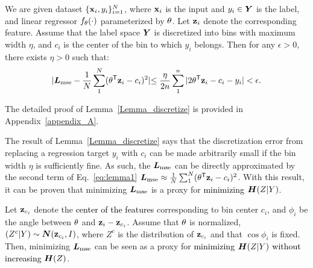 \documentclass{article} %
\def\shihao{\textcolor{black}}
\begin{document}
\begin{lemma}
\label{Lemma_discretize}
	We are given dataset $\{{\bf x}_i, y_i\}^N_{i=1}$, where ${\bf x}_i$ is the input and $y_i \in {\bm{Y}}$ is the label,
	and linear regressor $f_{\theta}(\cdot)$ parameterized by 
	${\theta}$.  
	Let ${\bf z}_i$ denote the corresponding feature. 
	Assume that the label space ${\bm{Y}}$ is discretized into bins with maximum width $\eta$, and $c_i$ is the center of the bin to which $y_i$ belongs. Then for any $\epsilon >0$, there exists $\eta>0$ such that:
\begin{equation}\label{eq:lemma1}
	 |\mL_{{\text{mse}}} - \frac{1}{N} \sum_{1}^{N}(\varreg^{\trsp}\bz_i -c_i)^2| \shihao{\leq  
    \frac{\eta}{2n} \sum_{1}^{n}|2\varreg^{\trsp}\bz_i -c_i -y_i|} < \epsilon.
    \end{equation}
\end{lemma}

The detailed proof of Lemma~\ref{Lemma_discretize} is provided in Appendix~\ref{appendix_A}. 

The result of Lemma~\ref{Lemma_discretize} says that the discretization error from replacing a regression target $y_i$ with $c_i$ can be made arbitrarily small if the bin width $\eta$ is sufficiently fine. As such, the ${\bm{L}}_{\text{mse}}$ can be directly approximated by the second term of Eq.~\ref{eq:lemma1} \ie  ${\bm{L}}_{\text{mse}} \approx \frac{1}{N} \sum_{1}^{N}({\theta}^{{\sf T}}{\bf z}_i -c_i)^2$. With this result, it can be proven that minimizing ${\bm{L}}_{\text{mse}}$ is a proxy for \shihao{minimizing} ${\bm{H}}(Z|Y)$.

\begin{thm}
Let ${\bf z}_{c_i}$ denote the \shihao{center of the features} corresponding to bin center $c_i$, and $\phi_i$ be the angle between ${\theta}$ and ${\bf z}_i -{\bf z}_{c_i}$. Assume that ${\theta}$ is normalized, $(Z^c | Y) \sim {\bm{N}}({\bf z}_{c_i}, I)$, where $Z^c$ is the distribution of ${\bf z}_{c_i}$ and that $\cos \phi_i$ is fixed. 
Then, minimizing ${\bm{L}}_{\text{mse}}$ can be seen as a proxy for \shihao{minimizing} ${\bm{H}}(Z|Y)$ \shihao{ without increasing ${\bm{H}}(Z)$}.
\label{thm:1}
\end{thm}
\end{document}
